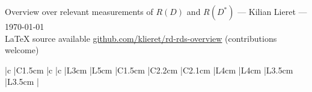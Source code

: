 


    \thispagestyle{empty}
    \begin{center}\Large
        Overview over relevant measurements of $R(D)$ and $R(D^*)$
        --- Kilian Lieret
        --- \today \\
        \large
        \LaTeX{} source available \url{github.com/klieret/rd-rds-overview} (contributions welcome)
    \end{center}
    
    \begin{center}
        \begin{tabular}{
                |c %
                |C{1.5cm} %
                |c %
                |c %
                |L{3cm} %
                |L{5cm} %
                |C{1.5cm} %
                |C{2.2cm} %
                |C{2.1cm} %
                |L{4cm} %
                |L{4cm} %
                |L{3.5cm} %
                |L{3.5cm} %
                |
                }
            \hline\hline
            
            \\\hline\hline
        \end{tabular}
    \end{center}
    
